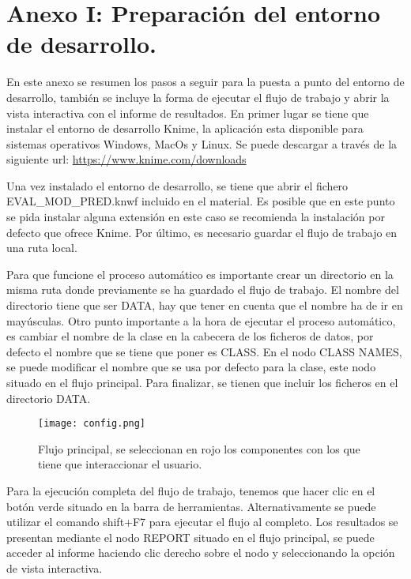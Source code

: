 \section{Anexo I: Preparación del entorno de desarrollo.}

En este anexo se resumen los pasos a seguir para la puesta a punto del entorno de desarrollo, también se incluye la forma de ejecutar el flujo de trabajo y abrir la vista interactiva con el informe de resultados. En primer lugar se tiene que instalar el entorno de desarrollo Knime, la aplicación esta disponible para sistemas operativos Windows, MacOs y Linux. Se puede descargar a través de la siguiente url: \url{https://www.knime.com/downloads}

\bigbreak

Una vez instalado el entorno de desarrollo, se tiene que abrir el fichero EVAL\_MOD\_PRED.knwf incluido en el material. Es posible que en este punto se pida instalar alguna extensión en este caso se recomienda la instalación por defecto que ofrece Knime. Por último, es necesario guardar el flujo de trabajo en una ruta local.

\bigbreak

Para que funcione el proceso automático es importante crear un directorio en la misma ruta donde previamente se ha guardado el flujo de trabajo. El nombre del directorio tiene que ser DATA, hay que tener en cuenta que el nombre ha de ir en mayúsculas. Otro punto importante a la hora de ejecutar el proceso automático, es cambiar el nombre de la clase en la cabecera de los ficheros de datos, por defecto el nombre que se tiene que poner es CLASS. En el nodo CLASS NAMES, se puede modificar el nombre que se usa por defecto para la clase, este nodo situado en el flujo principal. Para finalizar, se tienen que incluir los ficheros en el directorio DATA.

\bigbreak

\begin{figure}[htp]
    \centering
    \texttt{[image: config.png]}
    \caption{Flujo principal, se seleccionan en rojo los componentes con los que tiene que interaccionar el usuario.}
    \label{fig:4}
\end{figure}

\bigbreak

Para la ejecución completa del flujo de trabajo, tenemos que hacer clic en el botón verde situado en la barra de herramientas. Alternativamente se puede utilizar el comando shift+F7 para ejecutar el flujo al completo. Los resultados se presentan mediante el nodo REPORT situado en el flujo principal, se puede acceder al informe haciendo clic derecho sobre el nodo y seleccionando la opción de vista interactiva.

\clearpage